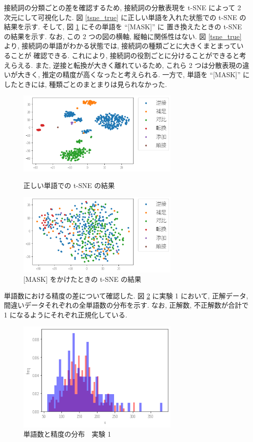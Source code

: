 \documentclass[twocolumn]{jarticle}     %
\begin{document}
接続詞の分類ごとの差を確認するため, 接続詞の分散表現を t-SNE によって 2 次元にして可視化した.
図 \ref{tsne_true} に正しい単語を入れた状態での t-SNE の結果を示す. そして, 図 \ref{tsne} にその単語を ``[MASK]'' に
置き換えたときの t-SNE の結果を示す. なお, この 2 つの図の横軸, 縦軸に関係性はない.
図 \ref{tsne_true} より, 接続詞の単語がわかる状態では, 接続詞の種類ごとに大きくまとまっていることが
確認できる. これにより, 接続詞の役割ごとに分けることができると考えらえる.
また, 逆接と転換が大きく離れているため, これら 2 つは分散表現の違いが大きく, 推定の精度が高くなったと考えられる.
一方で, 単語を ``[MASK]'' にしたときには, 種類ごとのまとまりは見られなかった.
\begin{figure}[ht]
	\begin{center}
		\includegraphics[width=80mm]{figure/tsne_true.png}
		\caption{正しい単語での t-SNE の結果}
		\label{tsne_true}
	\end{center}
  \begin{center}
    \includegraphics[width=80mm]{figure/tsne.png}
    \caption{[MASK] をかけたときの t-SNE の結果}
    \label{tsne}
  \end{center}
\end{figure}
単語数における精度の差について確認した.
図 \ref{tangosu1} に実験 1 において, 正解データ, 間違いデータそれぞれの全単語数の分布を示す.
なお, 正解数, 不正解数が合計で 1 になるようにそれぞれ正規化している.
\begin{figure}[ht]
	\begin{center}
		\includegraphics[width=80mm]{figure/tanosu_zikken1.png}
		\caption{単語数と精度の分布　実験 1}
		\label{tangosu1}
	\end{center}
\end{figure}
\end{document}
